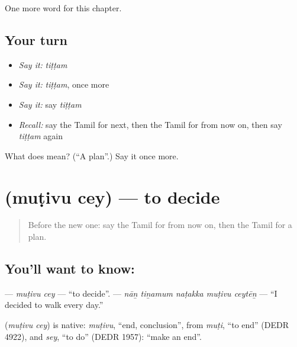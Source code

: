 \begin{grammarlens}[title={What you've built}]
One more word for this chapter.
\end{grammarlens}

\subsection*{Your turn}
\begin{itemize}
\raggedright
  \item \emph{Say it:} \emph{tiṭṭam}
  \item \emph{Say it:} \emph{tiṭṭam}, once more
  \item \emph{Say it:} say \emph{tiṭṭam}
  \item \emph{Recall:} say the Tamil for next, then the Tamil for from now on, then say \emph{tiṭṭam} again
\end{itemize}

\begin{tcolorbox}[breakable,colback=teal!4,colframe=teal!35!black,title={Before you move on}]
What does  mean? (\textquotedblleft{}A plan\textquotedblright{}.) Say it once more.
\end{tcolorbox}
\section[\texorpdfstring{\ta{முடிவு} \ta{செய்} (muṭivu cey)}{முடிவு செய் (muṭivu cey)}]{  (muṭivu cey) — to decide}

\label{lesson:TA-C159-mutivu-cey}



\begin{quote}
Before the new one: say the Tamil for from now on, then the Tamil for a plan.
\end{quote}

\subsection*{You'll want to know:  }
\textbf{ } — \emph{muṭivu cey} — \textquotedblleft{}to decide\textquotedblright{}. \textbf{    } — \emph{nāṉ tiṉamum naṭakka muṭivu ceytēṉ} — \textquotedblleft{}I decided to walk every day.\textquotedblright{}

\begin{cousinweb}
\textbf{ } (\emph{muṭivu cey}) is native: \emph{muṭivu}, \textquotedblleft{}end, conclusion\textquotedblright{}, from \emph{muṭi}, \textquotedblleft{}to end\textquotedblright{} (DEDR 4922), and \emph{sey}, \textquotedblleft{}to do\textquotedblright{} (DEDR 1957): \textquotedblleft{}make an end\textquotedblright{}.
\end{cousinweb}

